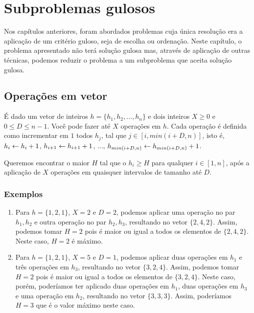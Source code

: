 \chapter{Subproblemas gulosos}
\label{subproblema}

Nos capítulos anteriores, foram abordados problemas cuja única resolução era a aplicação de um critério guloso, seja de escolha ou ordenação. Neste capítulo, o problema apresentado não terá solução gulosa mas, através de aplicação de outras técnicas, podemos reduzir o problema a um subproblema que aceita solução gulosa.

\section{Operações em vetor}

É dado um vetor de inteiros $h = \{h_1, h_2, ..., h_n\}$ e dois inteiros $X \geq 0$ e $0 \leq D \leq n - 1$. Você pode fazer até $X$ operações em $h$. Cada operação é definida como incrementar em $1$ todos $h_j$, tal que $j \in [i, min(i + D, n)]$, isto é, $h_i \leftarrow h_i + 1$, $h_{i + 1} \leftarrow h_{i + 1} + 1$, ..., $h_{min(i + D, n)} \leftarrow h_{min(i + D, n)} + 1$.

Queremos encontrar o maior $H$ tal que o $h_i \geq H$ para qualquer $i \in [1, n]$, após a aplicação de $X$ operações em quaisquer intervalos de tamanho até $D$.

\subsection*{Exemplos}

\begin{enumerate}
    \item Para $h = \{1, 2, 1\}$, $X = 2$ e $D = 2$, podemos aplicar uma operação no par $h_1, h_2$ e outra operação no par $h_2, h_3$, resultando no vetor $\{2, 4, 2\}$. Assim, podemos tomar $H = 2$ pois é maior ou igual a todos os elementos de $\{2, 4, 2\}$. Neste caso, $H = 2$ é máximo.
    \item Para $h = \{1, 2, 1\}$, $X = 5$ e $D = 1$, podemos aplicar duas operações em $h_1$ e três operações em $h_3$, resultando no vetor $\{3, 2, 4\}$. Assim, podemos tomar $H = 2$ pois é maior ou igual a todos os elementos de $\{3, 2, 4\}$. Neste caso, porém, poderíamos ter aplicado duas operações em $h_1$, duas operações em $h_3$ e uma operação em $h_2$, resultando no vetor $\{3, 3, 3\}$. Assim, poderíamos $H = 3$ que é o valor máximo neste caso.
\end{enumerate}

